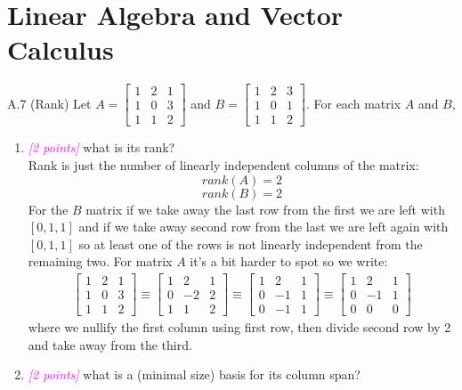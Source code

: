 \documentclass{article}
\newcommand{\1}{\mathbf{1}}
\newcommand{\points}[1]{\small\textcolor{magenta}{\emph{[#1 points]}} \normalsize}
\begin{document}
\section*{Linear Algebra and Vector Calculus}
A.7 (Rank) Let $A = \begin{bmatrix} 1 & 2 & 1 \\ 1 & 0 & 3 \\ 1 & 1 & 2 \end{bmatrix}$ and $B = \begin{bmatrix} 1 & 2 & 3 \\ 1 & 0 & 1 \\ 1 & 1 & 2 \end{bmatrix}$.
For each matrix $A$ and $B$,
\begin{enumerate} 
	\item \points{2} what is its rank?  \\
	
	Rank is just the number of linearly independent columns of the matrix:
	$$rank(A) = 2$$
	$$rank(B) = 2$$
	For the $B$ matrix if we take away the last row from the first we are left with $[0,1, 1]$ and if we take away second row from the last we are left again with $[0, 1, 1]$ so at least one of the rows is not linearly independent from the remaining two. For matrix $A$ it's a bit harder to spot so we write:
	\begin{align*}
	\begin{bmatrix} 1 & 2 & 1 \\ 1 & 0 & 3 \\ 1 & 1 & 2 \end{bmatrix} \equiv 
	\begin{bmatrix} 1 & 2 & 1 \\ 0 & -2 & 2 \\ 1 & 1 & 2\end{bmatrix} \equiv
	\begin{bmatrix} 1 & 2 & 1 \\ 0 & -1 & 1 \\ 0 & -1 & 1\end{bmatrix} \equiv
	\begin{bmatrix} 1 & 2 & 1 \\ 0 & -1 & 1 \\ 0 & 0 & 0\end{bmatrix}
	\end{align*}
	where we nullify the first column using first row, then divide second row by 2 and take away from the third.
	
	\item \points{2} what is a (minimal size) basis for its column span? \\
	

\end{enumerate}
\end{document}
